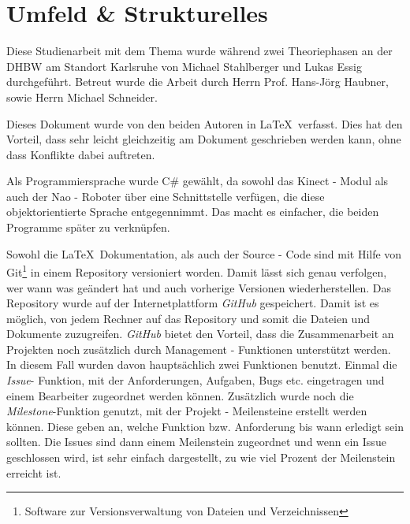 

\section{Umfeld \& Strukturelles}
Diese Studienarbeit mit dem Thema \textit{\Titel} wurde während zwei Theoriephasen an der \ac{DHBW} am Standort Karlsruhe von Michael Stahlberger und Lukas Essig durchgeführt. Betreut wurde die Arbeit durch Herrn Prof. Hans-Jörg Haubner, sowie Herrn Michael Schneider. 

Dieses Dokument wurde von den beiden Autoren in \LaTeX\ verfasst. Dies hat den Vorteil, dass sehr leicht gleichzeitig am Dokument geschrieben werden kann, ohne dass Konflikte dabei auftreten. 

Als Programmiersprache wurde C\# gewählt, da sowohl das Kinect - Modul als auch der Nao - Roboter über eine Schnittstelle verfügen, die diese objektorientierte Sprache entgegennimmt. Das macht es einfacher, die beiden Programme später zu verknüpfen.

Sowohl die \LaTeX\ Dokumentation, als auch der Source - Code sind mit Hilfe von Git\footnote{Software zur Versionsverwaltung von Dateien und Verzeichnissen}  in einem Repository versioniert worden. Damit lässt sich genau verfolgen, wer wann was geändert hat und auch vorherige Versionen wiederherstellen.
Das Repository wurde auf der Internetplattform \textit{GitHub}  gespeichert. Damit ist es möglich, von jedem Rechner auf das Repository und somit die Dateien und Dokumente zuzugreifen. \textit{GitHub} bietet den Vorteil, dass die Zusammenarbeit an Projekten noch zusätzlich durch Management - Funktionen unterstützt werden. In diesem Fall wurden davon hauptsächlich zwei Funktionen benutzt. Einmal die \textit{Issue}- Funktion, mit der Anforderungen, Aufgaben, Bugs etc. eingetragen und einem Bearbeiter zugeordnet werden können. Zusätzlich wurde noch die \textit{Milestone}-Funktion genutzt, mit der Projekt - Meilensteine erstellt werden können. Diese geben an, welche Funktion bzw. Anforderung bis wann erledigt sein sollten. Die Issues sind dann einem Meilenstein zugeordnet und wenn ein Issue geschlossen wird, ist sehr einfach dargestellt, zu wie viel Prozent der Meilenstein erreicht ist.



